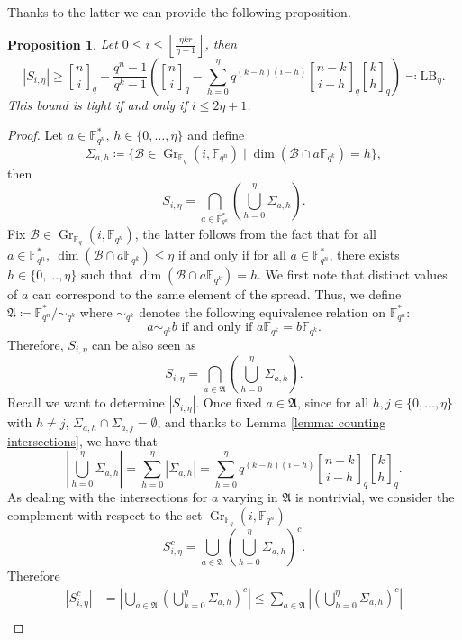 \documentclass[10pt,a4paper]{amsart}
\newtheorem{proposition}{Proposition}
\newcommand{\Fq}{\mathbb{F}_{q}}
\newcommand{\Fqk}{\mathbb{F}_{q^k}}
\newcommand{\Fqn}{\mathbb{F}_{q^n}}
\DeclareMathOperator{\Gr}{Gr}
\newcommand{\calB}{\mathcal{B}}
\newcommand{\gbinom}[2]{\genfrac{[}{]}{0pt}{}{#1}{#2}}
\begin{document}
    Thanks to the latter we can provide the following proposition. \begin{proposition}
        \label{ref: our lower bound}
        Let $0\leq i\leq\left\lfloor\frac{\eta kr}{\eta+1}\right\rfloor$, then
        \[
            \left\lvert S_{i,\eta}\right\rvert\geq \gbinom{n}{i}_q-\frac{q^n-1}{q^k-1}\left(\gbinom{n}{i}_q-\sum_{h=0}^\eta q^{(k-h)(i-h)}\gbinom{n-k}{i-h}_q\gbinom{k}{h}_q\right)\eqqcolon \mathrm{LB}_{\eta}.
        \]
        This bound is tight if and only if $i \leq 2 \eta + 1$.
    \end{proposition}

    \begin{proof}
        Let $a\in\Fqn^*$, $h\in\{0,\ldots,\eta\}$ and define 
    \[
    \Sigma_{a,h}\coloneqq \{\calB \in  \Gr_{\Fq}(i,\Fqn) \mid \dim(\calB \cap a \Fqk)=h\}, 
    \]
    then
    \[
    S_{i,\eta}=\bigcap_{a\in\Fqn^*}\left(\bigcup_{h=0}^\eta\Sigma_{a,h}\right).
    \]
    Fix $\calB \in  \Gr_{\Fq}(i,\Fqn)$, the latter follows from the fact that for all $a \in \Fqn^*,~\dim(\calB \cap a \Fqk) \leq \eta$ if and only if for all $a \in \Fqn^*$, there exists $h\in\{0,\ldots,\eta\}$ such that $\dim(\calB \cap a \Fqk)=h$. We first note that distinct values of $a$ can correspond to the same element of the spread. Thus, we define $\mathfrak{A}\coloneqq\Fqn^*/\sim_{q^k}$ where $\sim_{q^k}$ denotes the following equivalence relation on $\Fqn^*$: 
    \[
    a\sim_{q^k} b\text{ if and only if }a\Fqk=b\Fqk.
    \]
    Therefore, $S_{i,\eta}$ can be also seen as
    \[
    S_{i,\eta}=\bigcap_{a\in\mathfrak{A}}\left(\bigcup_{h=0}^\eta\Sigma_{a,h}\right).
    \]
    Recall we want to determine $|S_{i,\eta}|$. Once fixed $a\in\mathfrak{A}$, since for all $h,j\in\{0,\ldots,\eta\}$ with $h\neq j$, $\Sigma_{a,h}\cap\Sigma_{a,j}=\emptyset$, and thanks to Lemma \ref{lemma: counting intersections}, we have that
    \[
    \left\lvert\bigcup_{h=0}^\eta\Sigma_{a,h}\right\rvert=\sum_{h=0}^\eta\left\lvert\Sigma_{a,h}\right\rvert=\sum_{h=0}^\eta q^{(k-h)(i-h)}\gbinom{n-k}{i-h}_q\gbinom{k}{h}_q.
    \]
    As dealing with the intersections for $a$ varying in $\mathfrak{A}$ is nontrivial, we consider the complement with respect to the set $\Gr_{\Fq}(i,\Fqn)$
    \[
    S_{i,\eta}^c=\bigcup_{a\in\mathfrak{A}}\left(\bigcup_{h=0}^\eta\Sigma_{a,h}\right)^c.
    \]
    Therefore 
    \begin{equation}
    \label{eq: evasive space inequality bound}
        \begin{aligned}
            \left\lvert S_{i,\eta}^c\right\rvert&=\left\lvert \bigcup_{a\in\mathfrak{A}}\left(\bigcup_{h=0}^\eta\Sigma_{a,h}\right)^c\right\rvert\leq \sum_{a\in\mathfrak{A}} \left\lvert \left(\bigcup_{h=0}^\eta\Sigma_{a,h}\right)^c\right\rvert\\

\end{aligned}
\end{equation}
\end{proof}
\end{document}
